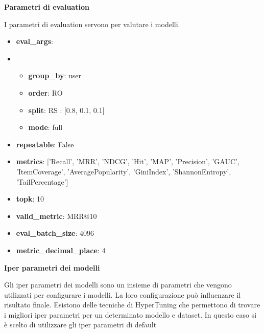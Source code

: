 \noindent \textbf{Parametri di evaluation}


\noindent I parametri di evaluation servono per valutare i modelli.
\begin{itemize}
    \item \textbf{eval\_args}:
    \item \begin{itemize}
                \item \textbf{group\_by}: user
                \item \textbf{order}: RO
                \item \textbf{split}: RS : [0.8, 0.1, 0.1]
                \item \textbf{mode}: full
            \end{itemize}
    \item \textbf{repeatable}: False
    \item \textbf{metrics}: ['Recall', 'MRR', 'NDCG', 'Hit', 'MAP', 'Precision', 'GAUC', 'ItemCoverage', 'AveragePopularity', 'GiniIndex', 'ShannonEntropy', 'TailPercentage']
    \item \textbf{topk}: 10
    \item \textbf{valid\_metric}: MRR@10
    \item \textbf{eval\_batch\_size}: 4096
    \item \textbf{metric\_decimal\_place}: 4
\end{itemize}


\noindent \textbf{Iper parametri dei modelli}


\noindent Gli iper parametri dei modelli sono un insieme di parametri che vengono utilizzati per configurare i modelli. La loro configurazione può influenzare il risultato finale. Esistono delle tecniche di HyperTuning che permettono di trovare i migliori iper parametri per un determinato modello e dataset.
In questo caso si è scelto di utilizzare gli iper parametri di default


